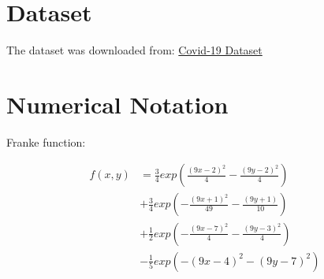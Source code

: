\documentclass[english,notitlepage,reprint,nofootinbib]{revtex4-1}  %
\begin{document}

\appendix
\section{Dataset} \label{sec: Dataset}
The dataset was downloaded from: \href{https://www.kaggle.com/datasets/meirnizri/covid19-dataset}{Covid-19 Dataset}

\section{Numerical Notation}\label{sec:NOTATION}
\caption{Franke function:}
\label{eq:FrankeFunction}
\begin{align*}
    f(x,y) &= \frac{3}{4} exp \left( \frac{(9x -2)^2}{4} - \frac{(9y -2)^2}{4}  \right) \\
    &+  \frac{3}{4} exp \left( -\frac{(9x + 1)^2}{49} - \frac{(9y + 1)}{10} \right) \\
    &+ \frac{1}{2} exp \left( -\frac{(9x -7)^2}{4} - \frac{(9y - 3)^2}{4} \right) \\
    &- \frac{1}{5} exp \left( - (9x - 4)^2 - (9y - 7)^2 \right)
\end{align*}
\end{document}
